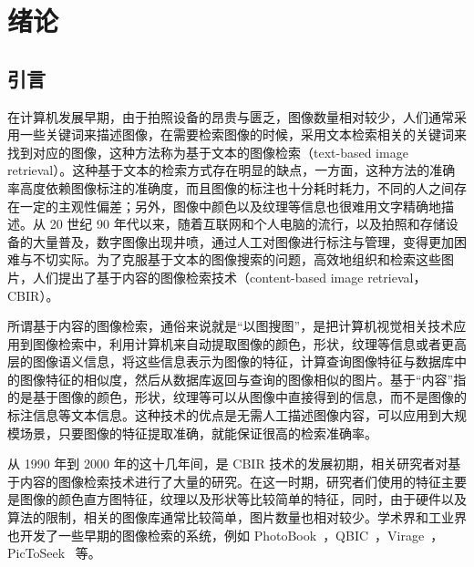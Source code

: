 
\chapter{绪论}
\label{Chapter_introduction}

\section{引言}
在计算机发展早期，由于拍照设备的昂贵与匮乏，图像数量相对较少，人们通常采用一些关键词来描述图像，在需要检索图像的时候，采用文本检索相关的关键词来找到对应的图像，这种方法称为基于文本的图像检索（text-based image retrieval）。这种基于文本的检索方式存在明显的缺点，一方面，这种方法的准确率高度依赖图像标注的准确度，而且图像的标注也十分耗时耗力，不同的人之间存在一定的主观性偏差；另外，图像中颜色以及纹理等信息也很难用文字精确地描述。从 20 世纪 90 年代以来，随着互联网和个人电脑的流行，以及拍照和存储设备的大量普及，数字图像出现井喷，通过人工对图像进行标注与管理，变得更加困难与不切实际。为了克服基于文本的图像搜索的问题，高效地组织和检索这些图片，人们提出了基于内容的图像检索技术（content-based image retrieval，CBIR）。

所谓基于内容的图像检索，通俗来说就是“以图搜图”，是把计算机视觉相关技术应用到图像检索中，利用计算机来自动提取图像的颜色，形状，纹理等信息或者更高层的图像语义信息，将这些信息表示为图像的特征，计算查询图像特征与数据库中的图像特征的相似度，然后从数据库返回与查询的图像相似的图片。基于“内容”指的是基于图像的颜色，形状，纹理等可以从图像中直接得到的信息，而不是图像的标注信息等文本信息。这种技术的优点是无需人工描述图像内容，可以应用到大规模场景，只要图像的特征提取准确，就能保证很高的检索准确率。

从 1990 年到 2000 年的这十几年间，是 CBIR 技术的发展初期，相关研究者对基于内容的图像检索技术进行了大量的研究。在这一时期，研究者们使用的特征主要是图像的颜色直方图特征，纹理以及形状等比较简单的特征，同时，由于硬件以及算法的限制，相关的图像库通常比较简单，图片数量也相对较少。学术界和工业界也开发了一些早期的图像检索的系统，例如 PhotoBook~\cite{Pentland1996PhotobookCM}，QBIC~\cite{Niblack1993TheQP}，Virage~\cite{Bach1996VirageIS}，PicToSeek~\cite{Gevers2000PicToSeekCC} 等。


